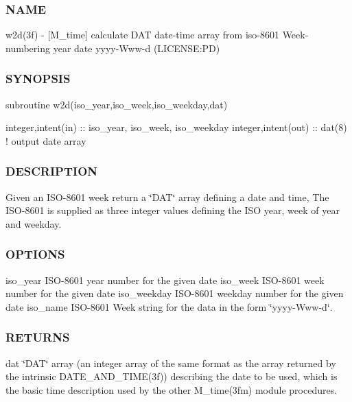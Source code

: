 \subsubsection*{N\+A\+ME}

w2d(3f) -\/ \mbox{[}M\+\_\+time\mbox{]} calculate D\+AT date-\/time array from iso-\/8601 Week-\/numbering year date yyyy-\/\+Www-\/d (L\+I\+C\+E\+N\+SE\+:PD) 

\subsubsection*{S\+Y\+N\+O\+P\+S\+IS}

\begin{DoxyVerb}subroutine w2d(iso_year,iso_week,iso_weekday,dat)

 integer,intent(in)      :: iso_year, iso_week, iso_weekday
 integer,intent(out)     :: dat(8)     ! output date array
\end{DoxyVerb}


\subsubsection*{D\+E\+S\+C\+R\+I\+P\+T\+I\+ON}

Given an I\+S\+O-\/8601 week return a \char`\"{}\+D\+A\+T\char`\"{} array defining a date and time, The I\+S\+O-\/8601 is supplied as three integer values defining the I\+SO year, week of year and weekday.

\subsubsection*{O\+P\+T\+I\+O\+NS}

iso\+\_\+year I\+S\+O-\/8601 year number for the given date iso\+\_\+week I\+S\+O-\/8601 week number for the given date iso\+\_\+weekday I\+S\+O-\/8601 weekday number for the given date iso\+\_\+name I\+S\+O-\/8601 Week string for the data in the form \char`\"{}yyyy-\/\+Www-\/d\char`\"{}.

\subsubsection*{R\+E\+T\+U\+R\+NS}

dat \char`\"{}\+D\+A\+T\char`\"{} array (an integer array of the same format as the array returned by the intrinsic D\+A\+T\+E\+\_\+\+A\+N\+D\+\_\+\+T\+I\+M\+E(3f)) describing the date to be used, which is the basic time description used by the other M\+\_\+time(3fm) module procedures.

